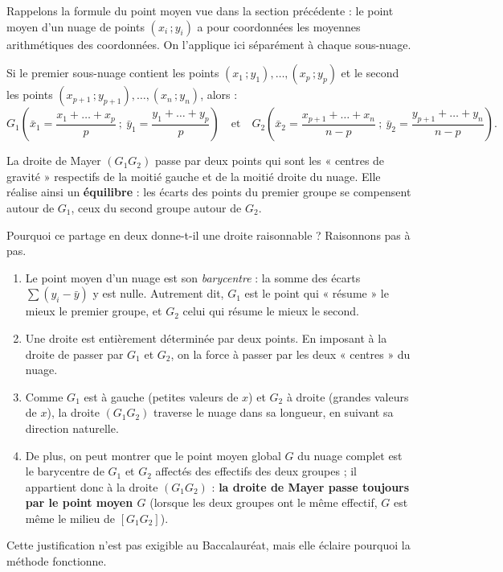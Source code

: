 \documentclass[11pt]{article}
\newcounter{popsec}
\newcounter{popsub}
\newcommand{\courssub}[1]{%
  \stepcounter{popsub}%
  \par\vspace{9pt}\noindent{\popxbold\fontsize{11.5}{13}\selectfont\color{popink}{\color{poporange}\thepopsec.\thepopsub}\hspace{6pt}#1}\par\nopagebreak\vspace{4pt}
}
\begin{document}
\courssub{Calcul des points moyens $G_1$ et $G_2$}

Rappelons la formule du point moyen vue dans la section précédente : le point moyen d'un nuage de points $(x_i\,;y_i)$ a pour coordonnées les moyennes arithmétiques des coordonnées. On l'applique ici séparément à chaque sous-nuage.

\begin{propriete}[Coordonnées de $G_1$ et $G_2$]
Si le premier sous-nuage contient les points $(x_1\,;y_1),\dots,(x_p\,;y_p)$ et le second les points $(x_{p+1}\,;y_{p+1}),\dots,(x_n\,;y_n)$, alors :
\[
G_1\left(\bar{x}_1 = \frac{x_1+\dots+x_p}{p}\ ;\ \bar{y}_1 = \frac{y_1+\dots+y_p}{p}\right)
\quad\text{et}\quad
G_2\left(\bar{x}_2 = \frac{x_{p+1}+\dots+x_n}{n-p}\ ;\ \bar{y}_2 = \frac{y_{p+1}+\dots+y_n}{n-p}\right).
\]
\end{propriete}

\begin{propriete}
La droite de Mayer $(G_1G_2)$ passe par deux points qui sont les « centres de gravité » respectifs de la moitié gauche et de la moitié droite du nuage. Elle réalise ainsi un \textbf{équilibre} : les écarts des points du premier groupe se compensent autour de $G_1$, ceux du second groupe autour de $G_2$.
\end{propriete}

\begin{experience}
Pourquoi ce partage en deux donne-t-il une droite raisonnable ? Raisonnons pas à pas.
\begin{enumerate}
\item Le point moyen d'un nuage est son \emph{barycentre} : la somme des écarts $\sum (y_i - \bar{y})$ y est nulle. Autrement dit, $G_1$ est le point qui « résume » le mieux le premier groupe, et $G_2$ celui qui résume le mieux le second.
\item Une droite est entièrement déterminée par deux points. En imposant à la droite de passer par $G_1$ et $G_2$, on la force à passer par les deux « centres » du nuage.
\item Comme $G_1$ est à gauche (petites valeurs de $x$) et $G_2$ à droite (grandes valeurs de $x$), la droite $(G_1G_2)$ traverse le nuage dans sa longueur, en suivant sa direction naturelle.
\item De plus, on peut montrer que le point moyen global $G$ du nuage complet est le barycentre de $G_1$ et $G_2$ affectés des effectifs des deux groupes ; il appartient donc à la droite $(G_1G_2)$ : \textbf{la droite de Mayer passe toujours par le point moyen $G$} (lorsque les deux groupes ont le même effectif, $G$ est même le milieu de $[G_1G_2]$).
\end{enumerate}
Cette justification n'est pas exigible au Baccalauréat, mais elle éclaire pourquoi la méthode fonctionne.
\end{experience}
\end{document}
